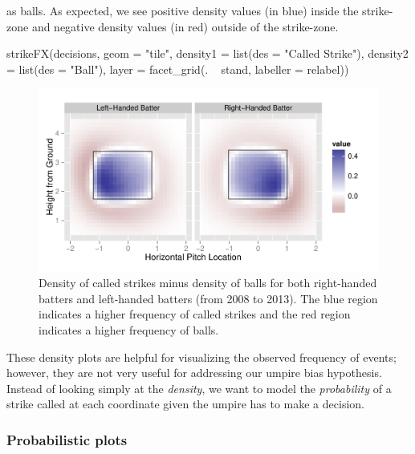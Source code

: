 \begin{article}
as balls. As expected, we see positive density values (in blue) inside
the strike-zone and negative density values (in red) outside of the
strike-zone. 
%
\begin{Schunk}
\begin{Sinput}
strikeFX(decisions, geom = "tile", density1 = list(des = "Called Strike"), 
  density2 = list(des = "Ball"), layer = facet_grid(. ~ stand, labeller = relabel)) 
\end{Sinput}
\end{Schunk}
%
\begin{figure}[h]
\centerline{\includegraphics[scale = 1]{strikesVSballs.pdf}}

\caption{\label{fig:strikesVSballs} Density of called strikes minus density
of balls for both right-handed batters and left-handed batters (from
2008 to 2013). The blue region indicates a higher frequency of called
strikes and the red region indicates a higher frequency of balls.}
\end{figure}


These density plots are helpful for visualizing the observed frequency
of events; however, they are not very useful for addressing our umpire
bias hypothesis. Instead of looking simply at the \emph{density},
we want to model the \emph{probability} of a strike called at each
coordinate given the umpire has to make a decision. 


\subsubsection{Probabilistic plots}


\end{article}
